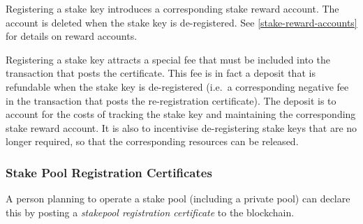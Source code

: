 \documentclass[11pt,a4paper]{article}
\begin{document}
Registering a stake key introduces a corresponding stake reward account.
The account is deleted when the stake key is de-registered. See
\ref{stake-reward-accounts} for details on reward accounts.

Registering a stake key attracts a special fee that must be included
into the transaction that posts the certificate. This fee is in fact a
deposit that is refundable when the stake key is de-registered (i.e.~a
corresponding negative fee in the transaction that posts the
re-registration certificate). The deposit is to account for the costs of
tracking the stake key and maintaining the corresponding stake reward
account. It is also to incentivise de-registering stake keys that are no
longer required, so that the corresponding resources can be released.

\subsubsection{Stake Pool Registration
Certificates}\label{stake-pool-registration-certificates}

A person planning to operate a stake pool (including a private pool) can
declare this by posting a \emph{stakepool registration certificate} to
the blockchain.
\end{document}
